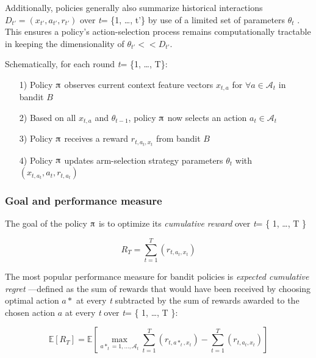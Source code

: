 \documentclass{jss}
\begin{document}
Additionally, policies generally also summarize historical interactions \( D_{t'} = (x_{t'},a_{t'},r_{t'}) \) over \emph{t}= \{1, \ldots, t'\} by use of a limited set of parameters $\theta_{t}$ \citep{kruijswijk2018streamingbandit}. This ensures a policy's action-selection process remains computationally tractable in keeping the dimensionality of $\theta_{t'} << D_{t'}$.

\clearpage

Schematically, for each round \emph{t}= \{1, \ldots, T\}:

\begin{enumerate}
         \item[1)] Policy $\piup$ observes current context feature vectors $x_{t,a}$ for $\forall a \in \mathcal{A}_t$ in bandit $B$
         \item[2)] Based on all $x_{t,a}$ and $\theta_{t-1}$, policy $\piup$ now selects an action \(a_{t} \in \mathcal{A}_t\)
         \item[3)] Policy $\piup$ receives a reward \(r_{t,a_t,x_t}\) from bandit $B$
         \item[4)] Policy $\piup$ updates arm-selection strategy parameters $\theta_{t}$ with \( (x_{t,a_t},a_t,r_{t,a_t}) \)
\end{enumerate}

\subsubsection{Goal and performance measure} \label{formalization}

The goal of the policy $\piup$ is to optimize its \textit{cumulative reward} over \emph{t}= \{ 1, \ldots, T \}

\begin{equation} \label{eq:1}
R_{T} = \sum^{T}_{t=1}(r_{t,a_t,x_t})
\end{equation}

The most popular performance measure for bandit policies is \textit{expected cumulative regret} \citep{Kuleshov2014}---defined as the sum of rewards that would have been received by choosing optimal action  $a*$ at every \emph{t} subtracted by the sum of rewards awarded to the chosen action $a$ at every \emph{t} over \emph{t}= \{ 1, \ldots, T \}:

\begin{equation} \label{eq:2}
\mathbb{E}\left[R_{T} \right] = \mathbb{E}\left[  \max_{a*_t = 1, \dots, \mathcal{A}_t} \sum^{T}_{t=1}(r_{t,a*_t,x_t}) - \sum^{T}_{t=1}(r_{t,a_t,x_t})\right]
\end{equation}
\end{document}
